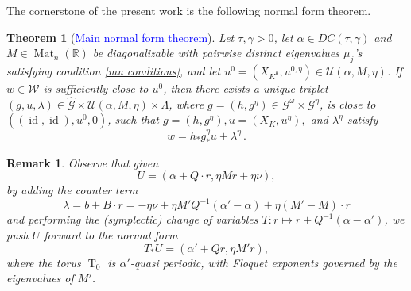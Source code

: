 \documentclass[oneside, 11pt]{amsbook}
\def\a{\alpha}
\def\Id{\rm Id}
\newcommand{\U}{\mathcal{U}}
\newcommand{\T}{\mathbb{T}}
\newcommand{\R}{\mathbb{R}}
\newcommand{\eps}{\varepsilon}
\newcommand{\Mat}{\operatorname{Mat}}
\newcommand{\GL}{\operatorname{GL}}
\newcommand{\id}{\operatorname{id}}
\def\U{{\mathcal U}}
\newcommand{\cG}{{\mathcal G}}
\newcommand{\cU}{{\mathcal U}}
\newcommand{\cW}{{\mathcal W}}
\newcommand{\al}{{\alpha}}
\newcommand{\0}{{(0)}}
\newcommand{\3}{{(3)}}
\newcommand{\blue}[1]{\textcolor{blue}{#1}}
\newtheorem{thm}{Theorem}[section]
\newtheorem{rmk}{Remark}[section]
\numberwithin{equation}{section}
\numberwithin{defn}{section}
\numberwithin{prop}{section}
\numberwithin{cor}{section}
\numberwithin{lemma}{section}
\numberwithin{rmk}{section}
\numberwithin{corollary}{section}
\newcommand{\To}{\operatorname{T}_0}
\begin{document}




\medskip






The cornerstone of the present work is the following normal form theorem. 

\begin{thm}[\blue{Main normal form theorem}]
	\label{Main NFT}
	 Let $\tau,\gamma > 0$, let $\alpha\in DC(\tau,\gamma)$ and $M\in\Mat_n(\R)$ be diagonalizable with pairwise distinct eigenvalues $\mu_j$'s satisfying condition \eqref{mu conditions}, and let $u^0 = (X_{K^0},u^{0,\eta})\in\cU(\alpha,M,\eta)$. If $w\in\cW$ is sufficiently close to $u^0$, then there exists a unique triplet $(g,u,\lambda)\in\hat\cG\times\cU(\alpha,M,\eta)\times \Lambda$, where $g=(h,g^\eta)\in\cG^\omega\times\cG^\eta$, is close to $((\id,\id), u^0,0)$, such that $g=(h,g^\eta),u=(X_K, u^\eta), $ and $ \lambda^\eta$ satisfy
	\begin{equation}
w = h_* g^\eta_* u  + \lambda^\eta\,.
	\end{equation}
	
\end{thm}


\begin{rmk}
Observe that given $$U = (\alpha + Q\cdot r, \eta Mr + \eta\nu),$$ by adding the counter term   $$\lambda= b + B\cdot r = -\eta\nu + \eta M'Q^{-1}(\alpha'-\alpha)+ \eta(M' - M)\cdot r$$ and performing the (symplectic) change of variables $T: r\mapsto r + Q^{-1}(\alpha - \alpha')$, we push $U$ forward to the normal form $$T_* U = (\alpha' + Q r, \eta M' r ), $$ where the torus $\To$ is $\alpha'$-quasi periodic, with Floquet exponents governed by the eigenvalues of $M'$.
\end{rmk}
\end{document}
